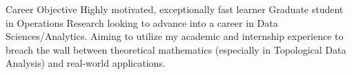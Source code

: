 
\begin{rSection}{Career Objective}
    Highly motivated, exceptionally fast learner Graduate student in Operations Research looking to advance into a career in Data Sciences/Analytics.
    Aiming to utilize my academic and internship experience to breach the wall between theoretical mathematics (especially in Topological Data Analysis) and real-world applications.
\end{rSection}